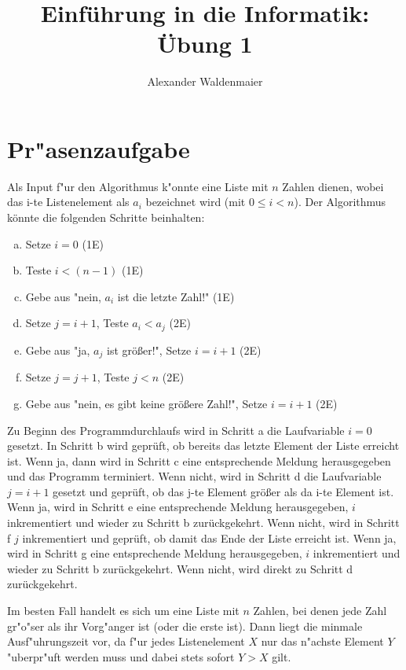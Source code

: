 \documentclass{article}
\title{Einführung in die Informatik: Übung 1}
\author{Alexander Waldenmaier}
\begin{document}
    \maketitle
    \section*{Pr"asenzaufgabe}
    Als Input f"ur den Algorithmus k"onnte eine Liste mit $n$ Zahlen dienen, wobei das i-te Listenelement als $a_i$ bezeichnet
    wird (mit $0\le i<n$). Der Algorithmus könnte die folgenden Schritte beinhalten:
    \begin{enumerate}[(a)]
        \item Setze $i=0$ (1E)
        \item Teste $i<(n-1)$ (1E)
        \item Gebe aus "nein, $a_i$ ist die letzte Zahl!" (1E)
        \item Setze $j=i+1$, Teste $a_i < a_{j}$ (2E)
        \item Gebe aus "ja, $a_j$ ist größer!", Setze $i=i+1$ (2E)
        \item Setze $j=j+1$, Teste $j<n$ (2E)
        \item Gebe aus "nein, es gibt keine größere Zahl!", Setze $i=i+1$ (2E)
    \end{enumerate}

    Zu Beginn des Programmdurchlaufs wird in Schritt a die Laufvariable $i=0$ gesetzt. 
    In Schritt b wird geprüft, ob bereits das letzte Element der Liste erreicht ist. 
    Wenn ja, dann wird in Schritt c eine entsprechende Meldung herausgegeben und das Programm terminiert.
    Wenn nicht, wird in Schritt d die Laufvariable $j=i+1$ gesetzt und geprüft, ob das j-te Element größer
    als da i-te Element ist. 
    Wenn ja, wird in Schritt e eine entsprechende Meldung herausgegeben, $i$ inkrementiert und
    wieder zu Schritt b zurückgekehrt. 
    Wenn nicht, wird in Schritt f $j$ inkrementiert und geprüft, ob damit das Ende der Liste erreicht ist. 
    Wenn ja, wird in Schritt g eine entsprechende Meldung herausgegeben, $i$ inkrementiert und wieder zu Schritt
    b zurückgekehrt. Wenn nicht, wird direkt zu Schritt d zurückgekehrt. 

    Im besten Fall handelt es sich um eine Liste mit $n$ Zahlen, bei denen jede Zahl gr"o"ser als ihr Vorg"anger ist (oder die erste ist).
    Dann liegt die minmale Ausf"uhrungszeit vor, da f"ur jedes Listenelement $X$ nur das n"achste Element $Y$ "uberpr"uft werden muss
    und dabei stets sofort $Y>X$ gilt. 
\end{document}
